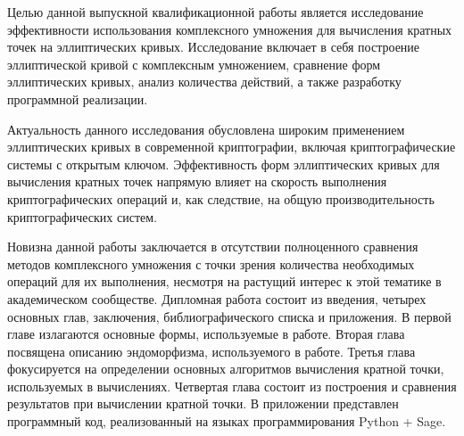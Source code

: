 Целью данной выпускной квалификационной работы является исследование эффективности использования комплексного умножения для вычисления кратных точек на эллиптических кривых. 
Исследование включает в себя построение эллиптической кривой с комплексным умножением, сравнение форм эллиптических кривых, анализ количества действий, а также разработку программной реализации.

Актуальность данного исследования обусловлена широким применением эллиптических кривых в современной криптографии, включая криптографические системы с открытым ключом. Эффективность форм эллиптических кривых для вычисления кратных точек напрямую влияет на скорость выполнения криптографических операций и, как следствие, на общую производительность криптографических систем.

Новизна данной работы заключается в отсутствии полноценного сравнения методов комплексного умножения с точки зрения количества необходимых операций для их выполнения, несмотря на растущий интерес к этой тематике в академическом сообществе. Дипломная работа состоит из введения, четырех основных глав, заключения, библиографического списка и приложения. В первой главе излагаются основные формы, используемые в работе. Вторая глава посвящена описанию эндоморфизма, используемого в работе. Третья глава фокусируется на определении основных алгоритмов вычисления кратной точки, используемых в вычислениях. Четвертая глава состоит из построения и сравнения результатов при вычислении кратной точки. В приложении представлен программный код, реализованный на языках программирования Python + Sage.
